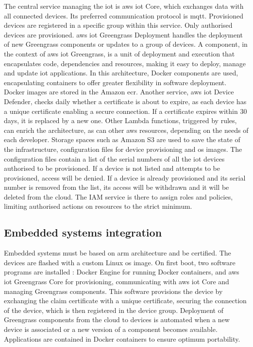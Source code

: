 The central service managing the \acrshort{iot} is \gls{aws} \acrshort{iot} Core, which exchanges data with all connected devices. Its preferred communication protocol is \acrshort{mqtt}. Provisioned devices are registered in a specific group within this service. Only authorised devices are provisioned. \gls{aws} \acrshort{iot} Greengrass Deployment handles the deployment of new Greengrass components or updates to a group of devices. A component, in the context of \gls{aws} \acrshort{iot} Greengrass, is a unit of deployment and execution that encapsulates code, dependencies and resources, making it easy to deploy, manage and update \acrshort{iot} applications. In this architecture, Docker components are used, encapsulating containers to offer greater flexibility in software deployment. Docker images are stored in the Amazon \acrfull{ecr}. Another service, \gls{aws} \acrshort{iot} Device Defender, checks daily whether a certificate is about to expire, as each device has a unique certificate enabling a secure connection. If a certificate expires within 30 days, it is replaced by a new one. Other Lambda functions, triggered by rules, can enrich the architecture, as can other \gls{aws} resources, depending on the needs of each developer. Storage spaces such as Amazon S3 are used to save the state of the infrastructure, configuration files for device \gls{provisioning} and \acrshort{os} images. The configuration files contain a list of the serial numbers of all the \acrshort{iot} devices authorised to be provisioned. If a device is not listed and attempts to be provisioned, access will be denied. If a device is already provisioned and its serial number is removed from the list, its access will be withdrawn and it will be deleted from the \gls{cloud}. The IAM service is there to assign roles and policies, limiting authorised actions on resources to the strict minimum.

\subsection{Embedded systems integration}
Embedded systems must be based on \gls{arm} architecture and be  certified. The devices are flashed with a custom Linux \acrshort{os} image. On first boot, two software programs are installed : Docker Engine for running Docker containers, and \gls{aws} \acrshort{iot} Greengrass Core for \gls{provisioning}, communicating with \gls{aws} \acrshort{iot} Core and managing Greengrass components. This software provisions the device by exchanging the claim certificate with a unique certificate, securing the connection of the device, which is then registered in the device group. Deployment of Greengrass components from the \gls{cloud} to devices is automated when a new device is associated or a new version of a component becomes available. Applications are contained in Docker containers to ensure optimum portability.


